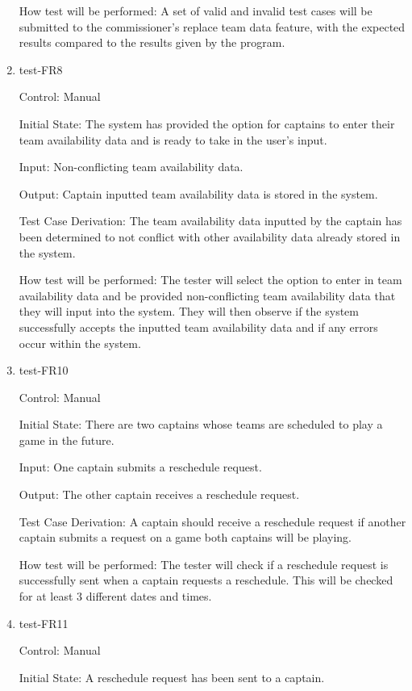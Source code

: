 \documentclass[12pt, titlepage]{article}
\begin{document}
\begin{enumerate}
How test will be performed: A set of valid and invalid test cases will be
submitted to the commissioner's replace team data feature, with the expected
results compared to the results given by the program.

\item{test-FR8\\}

Control: Manual
					
Initial State: The system has provided the option for captains to enter their team
availability data and is ready to take in the user's input.
					
Input: Non-conflicting team availability data.
					
Output: Captain inputted team availability data is stored in the system.

Test Case Derivation: The team availability data inputted by the captain has been
determined to not conflict with other availability data already stored in the system.
					
How test will be performed: The tester will select the option to enter in team 
availability data and be provided non-conflicting team availability
data that they will input into the system. They will then observe if the system successfully
accepts the inputted team availability data and if any errors occur within the system. 

\item{test-FR10\\}

Control: Manual

Initial State: There are two captains whose teams are scheduled to play a
game in the future.
          
Input: One captain submits a reschedule request.

Output: The other captain receives a reschedule request.

Test Case Derivation: A captain should receive a reschedule request if another
captain submits a request on a game both captains will be playing.

How test will be performed: The tester will check if a reschedule request is
successfully sent when a captain requests a reschedule. This will be checked
for at least 3 different dates and times.

\item{test-FR11\\}

Control: Manual

Initial State: A reschedule request has been sent to a captain.
          

\end{enumerate}
\end{document}
